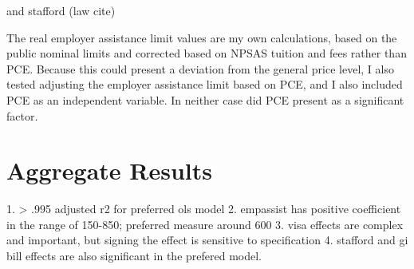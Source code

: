 \documentclass[review]{elsarticle}
\begin{document}
    and stafford (law cite)
    

    The real employer assistance limit values are my own calculations,
    based on the public nominal limits and corrected based on NPSAS tuition and fees rather than PCE.
    Because this could present a deviation from the general price level, I also tested adjusting the employer assistance limit based on PCE,
    and I also included PCE as an independent variable. In neither case did PCE present as a significant factor.


    \section{Aggregate Results}

    1. > .995 adjusted r2 for preferred ols model
    2. empassist has positive coefficient in the range of 150-850; preferred measure around 600
    3. visa effects are complex and important, but signing the effect is sensitive to specification
    4. stafford and gi bill effects are also significant in the prefered model.
\end{document}
